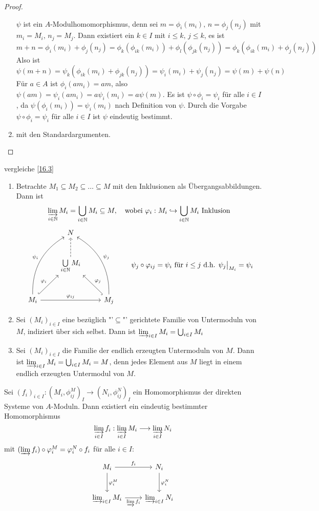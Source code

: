 \begin{proof}
\begin{enumerate}[label= \alph*)]
	$\psi$ ist ein $A$-Modulhomomorphismus, denn sei $m= \phi_i(m_i), \, n= \phi_j(n_j) $ mit $m_i = M_i, \, n_j = M_j$. Dann existiert ein $k\in I$ mit $i\leq k, \, j \le k$, es ist 
	$$m+n = \phi_i(m_i) + \phi_j(n_j) = \phi_k(\phi_{ik}(m_i)) + \phi_l(\phi_{jk}(n_j)) = \phi_k(\phi_{ik}(m_i) + \phi_j(n_j))$$
	Also ist 
	$$\psi(m+n) = \psi_k(\phi_{ik}(m_i) + \phi_{jk}(n_j)) = \psi_i(m_i) + \psi_{j}(n_j) = \psi(m) + \psi(n)$$
	Für $a\in A$ ist $\phi_i(am_i) = am$, also $\psi(am) = \psi_i(am_i) = a \psi_i(m_i) = a \psi(m)$. Es ist $\psi \circ \phi_i = \psi_i$ für alle $i\in I$, da $\psi(\phi_i(m_i)) = \psi_i(m_i)$ nach Definition von $\psi$. Durch die Vorgabe $\psi \circ \phi_i = \psi_i$ für alle $i\in I$ ist $\psi$ eindeutig bestimmt.
	\item mit den Standardargumenten.
	\end{enumerate}
\end{proof}
\begin{bsp}
		vergleiche \ref{16.3}
	\begin{enumerate}[label= \alph*)]
		\item Betrachte $M_1 \subseteq M_2 \subseteq \ldots \subseteq M$ mit den Inklusionen als Übergangsabbildungen. Dann ist 
		$$\varinjlim_{i\in \N} M_i = \bigcup_{i\in \N} M_i \subseteq M, \quad \text{wobei }\phi_i :M_i \hookrightarrow \bigcup_{i\in \N}M_i \text{ Inklusion}$$
			$$\begin{tikzcd}[row sep = large]
		& N & \\
		& \bigcup\limits_{i\in \N}M_i \arrow[dashed]{u}& \\
		M_i \arrow[hook]{ur}{\phi_i} \arrow[bend left]{uur}{\psi_i} \arrow{rr}{\phi_{ij}} & & M_j \arrow[swap, hook]{ul}{\phi_j} \arrow[bend right, swap]{uul}{\psi_j}
		\end{tikzcd}\qquad \psi_j \circ \phi_{ij} = \psi_i \text{ für } i\leq j \text{ d.h. } \psi_j \big|_{M_i} = \psi_i$$
		\item Sei $(M_i)_{i\in I}$ eine bezüglich "'$\subseteq$"' gerichtete Familie von Untermoduln von $M$, indiziert über sich selbst. Dann ist $\varinjlim_{i\in I} M_i = \bigcup_{i\in I} M_i$
		\item Sei $(M_i)_{i\in I}$ die Familie der endlich erzeugten Untermoduln von $M$. Dann ist $\varinjlim_{i\in I} M_i = \bigcup_{i\in I} M_i = M$, denn jedes Element aus $M$ liegt in einem endlich erzeugten Untermodul von $M$.
	\end{enumerate}
\end{bsp}
\begin{bem}\label{16.8}
	Sei $(f_i)_{i\in I}:(M_i, \phi_{ij}^M)_I \to (N_i, \phi_{ij}^N)_I$ ein Homomorphismus der direkten Systeme von $A$-Moduln. Dann existiert ein eindeutig bestimmter Homomorphismus 
	$$\varinjlim_{i\in I} f_i: \varinjlim_{i\in I} M_i \longrightarrow \varinjlim_{i\in I} N_i$$
	mit $(\varinjlim f_i) \circ \phi_i^M = \phi_i^N \circ f_i $ für alle $i\in I$:
	$$\begin{tikzcd}[row sep = large]
	M_i \arrow{r}{f_i} \arrow{d}{\phi_i^M} & N_i \arrow{d}{\phi_i^N} \\
	\varinjlim_{i\in I} M_i \arrow[swap]{r}{\varinjlim f_i} & \varinjlim_{i\in I} N_i
	\end{tikzcd}$$
\end{bem}
